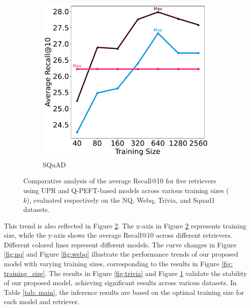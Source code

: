 \documentclass[sigconf,natbib=true,anonymous=false]{acmart}
\begin{document}
\begin{figure}[htbp]
\begin{minipage}{0.23\textwidth}
        \begin{subfigure}[b]{\textwidth}
            \includegraphics[width=\textwidth]{Figures/r_retriever_k_multi_avg_webq.pdf}
            \caption{SQuAD}
            \label{fig:squad1}
        \end{subfigure}
    \end{minipage}
    \caption{Comparative analysis of the average Recall@10 for five retrievers using UPR and Q-PEFT-based models across various training sizes ($k$), evaluated respectively on the NQ, Webq, Trivia, and Squad1 datasets.}
    \label{fig: training_size_average}
\end{figure}

This trend is also reflected in Figure \ref{fig: training_size_average}. The x-axis in Figure \ref{fig: training_size_average} represents training size, while the y-axis shows the average Recall@10 across different retrievers. Different colored lines represent different models. The curve changes in Figure \ref{fig:nq} and Figure \ref{fig:webq} illustrate the performance trends of our proposed model with varying training sizes, corresponding to the results in Figure \ref{fig: training_size}. The results in Figure \ref{fig:trivia} and Figure \ref{fig:squad1} validate the stability of our proposed model, achieving significant results across various datasets. In Table \ref{tab: main}, the inference results are based on the optimal training size for each model and retriever.
\end{document}
